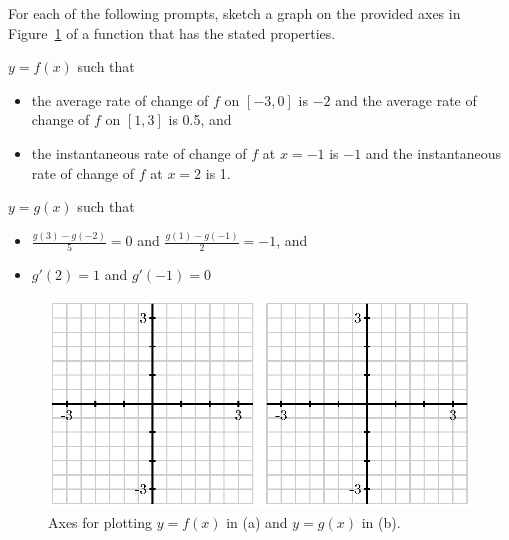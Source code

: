 \begin{exercises}
\begin{exerciseSolution}
\end{exerciseSolution}
\item For each of the following prompts, sketch a graph on the provided axes in Figure~\ref{F:1.3.Ez2} of a function that has the stated properties.
  \ba
  	\item $y = f(x)$ such that 
	\begin{itemize}
		\item the average rate of change of $f$ on $[-3,0]$ is $-2$ and the average rate of change of $f$ on $[1,3]$ is 0.5, and
		\item the instantaneous rate of change of $f$ at $x = -1$ is $-1$ and the instantaneous rate of change of $f$ at $x = 2$ is 1. 
	\end{itemize}
	\item $y = g(x)$ such that
	\begin{itemize}
		\item $\frac{g(3)-g(-2)}{5} = 0$ and $\frac{g(1)-g(-1)}{2} = -1$, and
		\item $g'(2) = 1$ and $g'(-1) = 0$
	\end{itemize}
\begin{figure}[h]
  \begin{center}
 \includegraphics{figures/1_2_Ez3.eps} %
   \end{center}
   \caption{Axes for plotting $y = f(x)$ in (a) and $y = g(x)$ in (b).} \label{F:1.3.Ez2}
\end{figure}
  \ea


\end{exercises}
